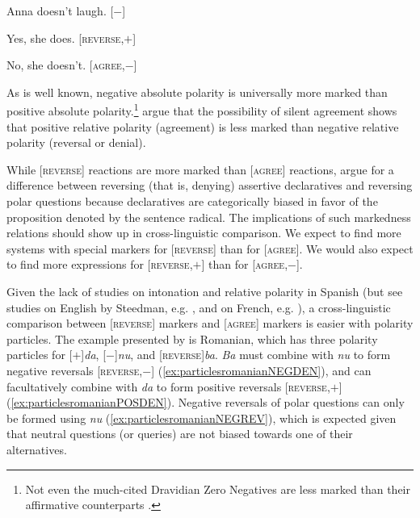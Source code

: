 \begin{exe}
	\ex \label{ex:polarity}
    \begin{xlist}[A:]  Anna doesn't laugh. \hfill [$-$]
		\begin{xlista}
		\ex \begin{xlist}[A:] Yes, she does. \hfill [\textsc{reverse},$+$] \end{xlist}
		\ex \begin{xlist}[A:] No, she doesn't. \hfill  [\textsc{agree},$-$] \end{xlist}
		\end{xlista}
	\end{xlist}
\end{exe}


As is well known, negative absolute polarity is universally more marked than positive absolute polarity.\footnote{Not even the much-cited Dravidian Zero Negatives are less marked than their affirmative counterparts \citep[188--189]{Miestamo.2010}.} \citet{FarkasBruce.2010} argue that the possibility of silent agreement shows that positive relative polarity (agreement) is less marked than negative relative polarity (reversal or denial).

While [\textsc{reverse}] reactions are more marked than [\textsc{agree}] reactions, \citet{FarkasBruce.2010} argue for a difference between reversing (that is, denying) assertive declaratives and reversing polar questions because declaratives are categorically biased in favor of the proposition denoted by the sentence radical. The implications of such markedness relations should show up in cross-linguistic comparison. We expect to find more systems with special markers for [\textsc{reverse}] than for [\textsc{agree}]. We would also expect to find more expressions for [\textsc{reverse},$+$] than for [\textsc{agree},$-$].

Given the lack of studies on intonation and relative polarity in Spanish (but see studies on English by Steedman, e.g. \cite{Steedman.2007}, and on French, e.g. \cite{BeyssadeMarandin.2007,BeyssadeMarandin.2009,PortesReyle.2014}), a cross-linguistic comparison between [\textsc{reverse}] markers and [\textsc{agree}] markers is easier with polarity particles. The example presented by \citet{FarkasBruce.2010} is Romanian, which has three polarity particles for [$+$]\textit{da}, [$-$]\textit{nu}, and [\textsc{reverse}]\textit{ba}. \textit{Ba} must combine with \textit{nu} to form negative reversals [\textsc{reverse},$-$] (\ref{ex:particlesromanianNEGDEN}), and can facultatively combine with \textit{da} to form positive reversals [\textsc{reverse},$+$] (\ref{ex:particlesromanianPOSDEN}). Negative reversals of polar questions can only be formed using \textit{nu} (\ref{ex:particlesromanianNEGREV}), which is expected given that neutral questions (or queries) are not biased towards one of their alternatives.


